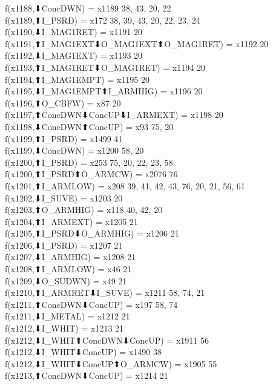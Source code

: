 f(x1188,⬇ConcDWN) = x1189 {38, 43, 20, 22} \\
f(x1189,⬆I_PSRD) = x172 {38, 39, 43, 20, 22, 23, 24} \\
f(x1190,⬇I_MAG1RET) = x1191 {20} \\
f(x1191,⬆I_MAG1EXT⬇O_MAG1EXT⬆O_MAG1RET) = x1192 {20} \\
f(x1192,⬇I_MAG1EXT) = x1193 {20} \\
f(x1193,⬆I_MAG1RET⬇O_MAG1RET) = x1194 {20} \\
f(x1194,⬆I_MAG1EMPT) = x1195 {20} \\
f(x1195,⬇I_MAG1EMPT⬆I_ARMHIG) = x1196 {20} \\
f(x1196,⬆O_CBFW) = x87 {20} \\
f(x1197,⬆ConcDWN⬇ConcUP⬇I_ARMEXT) = x1198 {20} \\
f(x1198,⬇ConcDWN⬆ConcUP) = x93 {75, 20} \\
f(x1199,⬆I_PSRD) = x1499 {41} \\
f(x1199,⬇ConcDWN) = x1200 {58, 20} \\
f(x1200,⬆I_PSRD) = x253 {75, 20, 22, 23, 58} \\
f(x1200,⬆I_PSRD⬆O_ARMCW) = x2076 {76} \\
f(x1201,⬆I_ARMLOW) = x208 {39, 41, 42, 43, 76, 20, 21, 56, 61} \\
f(x1202,⬇I_SUVE) = x1203 {20} \\
f(x1203,⬆O_ARMHIG) = x118 {40, 42, 20} \\
f(x1204,⬆I_ARMEXT) = x1205 {21} \\
f(x1205,⬆I_PSRD⬇O_ARMHIG) = x1206 {21} \\
f(x1206,⬇I_PSRD) = x1207 {21} \\
f(x1207,⬇I_ARMHIG) = x1208 {21} \\
f(x1208,⬆I_ARMLOW) = x46 {21} \\
f(x1209,⬇O_SUDWN) = x49 {21} \\
f(x1210,⬆I_ARMRET⬇I_SUVE) = x1211 {58, 74, 21} \\
f(x1211,⬆ConcDWN⬇ConcUP) = x197 {58, 74} \\
f(x1211,⬇I_METAL) = x1212 {21} \\
f(x1212,⬇I_WHIT) = x1213 {21} \\
f(x1212,⬇I_WHIT⬆ConcDWN⬇ConcUP) = x1911 {56} \\
f(x1212,⬇I_WHIT⬇ConcUP) = x1490 {38} \\
f(x1212,⬇I_WHIT⬇ConcUP⬆O_ARMCW) = x1905 {55} \\
f(x1213,⬆ConcDWN⬇ConcUP) = x1214 {21} \\
